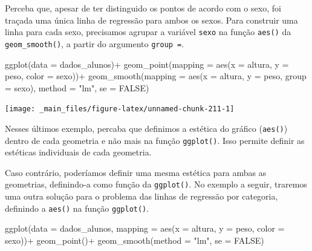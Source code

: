 \documentclass[
  brazilian,
]{book}
\newenvironment{Shaded}{\begin{snugshade}}{\end{snugshade}}
\newcommand{\AttributeTok}[1]{\textcolor[rgb]{0.77,0.63,0.00}{#1}}
\newcommand{\ConstantTok}[1]{\textcolor[rgb]{0.00,0.00,0.00}{#1}}
\newcommand{\FunctionTok}[1]{\textcolor[rgb]{0.00,0.00,0.00}{#1}}
\newcommand{\NormalTok}[1]{#1}
\newcommand{\SpecialCharTok}[1]{\textcolor[rgb]{0.00,0.00,0.00}{#1}}
\newcommand{\StringTok}[1]{\textcolor[rgb]{0.31,0.60,0.02}{#1}}
\begin{document}
Perceba que, apesar de ter distinguido os pontos de acordo com o sexo, foi traçada uma única linha de regressão para ambos os sexos. Para construir uma linha para cada sexo, precisamos agrupar a variável \texttt{sexo} na função \texttt{aes()} da \texttt{geom\_smooth()}, a partir do argumento \texttt{group\ =}.

\begin{Shaded}
\begin{Highlighting}[]
\FunctionTok{ggplot}\NormalTok{(}\AttributeTok{data =}\NormalTok{ dados\_alunos)}\SpecialCharTok{+}
  \FunctionTok{geom\_point}\NormalTok{(}\AttributeTok{mapping =} \FunctionTok{aes}\NormalTok{(}\AttributeTok{x =}\NormalTok{ altura,}
                           \AttributeTok{y =}\NormalTok{ peso,}
                           \AttributeTok{color =}\NormalTok{ sexo))}\SpecialCharTok{+}
  \FunctionTok{geom\_smooth}\NormalTok{(}\AttributeTok{mapping =} \FunctionTok{aes}\NormalTok{(}\AttributeTok{x =}\NormalTok{ altura,}
                            \AttributeTok{y =}\NormalTok{ peso,}
                            \AttributeTok{group =}\NormalTok{ sexo),}
              \AttributeTok{method =} \StringTok{"lm"}\NormalTok{,}
              \AttributeTok{se =} \ConstantTok{FALSE}\NormalTok{)}
\end{Highlighting}
\end{Shaded}

\begin{center}\texttt{[image: \_main\_files/figure-latex/unnamed-chunk-211-1]} \end{center}

Nesses últimos exemplo, percaba que definimos a estética do gráfico (\texttt{aes()}) dentro de cada geometria e não mais na função \texttt{ggplot()}. Isso permite definir as estéticas individuais de cada geometria.

Caso contrário, poderíamos definir uma mesma estética para ambas as geometrias, definindo-a como função da \texttt{ggplot()}. No exemplo a seguir, traremos uma outra solução para o problema das linhas de regressão por categoria, definindo a \texttt{aes()} na função \texttt{ggplot()}.

\begin{Shaded}
\begin{Highlighting}[]
\FunctionTok{ggplot}\NormalTok{(}\AttributeTok{data =}\NormalTok{ dados\_alunos,}
       \AttributeTok{mapping =} \FunctionTok{aes}\NormalTok{(}\AttributeTok{x =}\NormalTok{ altura,}
                     \AttributeTok{y =}\NormalTok{ peso,}
                     \AttributeTok{color =}\NormalTok{ sexo))}\SpecialCharTok{+}
  \FunctionTok{geom\_point}\NormalTok{()}\SpecialCharTok{+}
  \FunctionTok{geom\_smooth}\NormalTok{(}\AttributeTok{method =} \StringTok{"lm"}\NormalTok{,}
              \AttributeTok{se =} \ConstantTok{FALSE}\NormalTok{)}
\end{Highlighting}
\end{Shaded}
\end{document}
